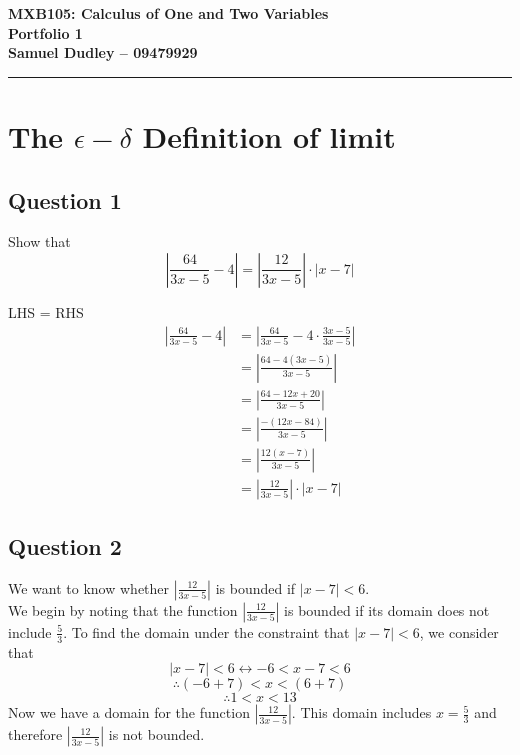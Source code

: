 \documentclass{article}
\begin{document}
\begin{center}
\Large{\textbf{MXB105: Calculus of One and Two Variables}}\\
\Large{\textbf{Portfolio 1}}\\
\Large{\textbf{Samuel Dudley -- 09479929}}\\
\end{center}
\rule{\textwidth}{1pt}

\section*{The $\epsilon - \delta$ Definition of limit}
\subsection*{Question 1}
Show that
$$\left| \frac{64}{3x-5} - 4 \right| = \left| \frac{12}{3x-5} \right| \cdot |x-7|$$

LHS = RHS
\begin{align*}
\left| \frac{64}{3x-5} - 4 \right| &= \left| \frac{64}{3x-5} - 4 \cdot \frac{3x-5}{3x-5} \right|\\
&= \left| \frac{64-4(3x-5)}{3x-5} \right|\\
&= \left| \frac{64-12x+20}{3x-5} \right|\\
&= \left| \frac{-(12x-84)}{3x-5} \right|\\
&= \left| \frac{12(x-7)}{3x-5} \right|\\
&= \left| \frac{12}{3x-5} \right| \cdot |x-7| 
\end{align*}

\subsection*{Question 2}

We want to know whether $\displaystyle \left| \frac{12}{3x-5} \right|$ is bounded if $\left| x-7 \right|< 6$.\\
We begin by noting that the function $\left| \frac{12}{3x-5} \right|$ is bounded if its domain does not include $\frac{5}{3}$. 
To find the domain under the constraint that $\left| x-7 \right|< 6$, we consider that
$$\left| x-7 \right| < 6 \leftrightarrow -6 < x-7 < 6 $$
$$\therefore \left(-6 + 7 \right) < x < \left(6 + 7\right) $$
$$\therefore 1 < x < 13 $$
Now we have a domain for the function $\left| \frac{12}{3x-5} \right|$. This domain includes $x = \frac{5}{3}$ and therefore $\left| \frac{12}{3x-5} \right|$ is not bounded. \\
\end{document}

